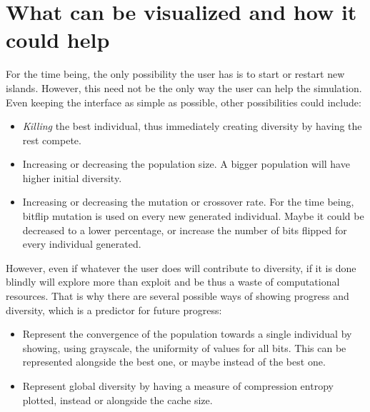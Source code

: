 \documentclass{sig-alternate}
\begin{document}
\section{What can be visualized and how it could help}
\label{sec:conclusion}

For the time being, the only possibility the user has is to start  or
restart new islands. However, this need not be the only way the user
can help the simulation. Even keeping the interface as simple as
possible, other possibilities could include:\begin{itemize}
\item {\em Killing} the best individual, thus immediately creating
  diversity by having the rest compete.
\item Increasing or decreasing the population size. A bigger
  population will have higher initial diversity.
\item Increasing or decreasing the mutation or crossover rate. For the time being,
  bitflip mutation is used on every new generated individual. Maybe it
  could be decreased to a lower percentage, or increase the number of
  bits flipped for every individual generated.
\end{itemize}

However, even if whatever the user does will contribute to diversity,
if it is done blindly will explore more than exploit and be thus a
waste of computational resources. That is why there are several
possible ways of showing progress and diversity, which is a predictor
for future progress:\begin{itemize}
\item Represent the convergence of the population towards a single
  individual by showing, using grayscale, the uniformity of values for
  all bits. This can be represented alongside the best one, or maybe
  instead of the best one.
\item Represent global diversity by having a measure of compression
  entropy plotted, instead or alongside the cache size.
\end{itemize}
\end{document}
